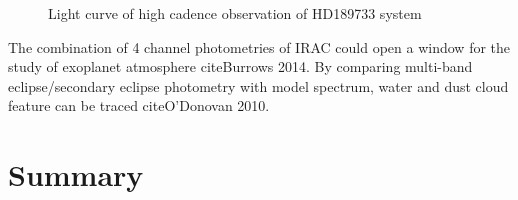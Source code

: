 \documentclass[preprint, 12pt]{aastex}
\begin{document}
\begin{figure}
  \centering
  \caption{Light curve of high cadence observation of HD189733 system}
  \label{fig:iraf-lc2}
\end{figure}

The combination of 4 channel photometries of IRAC could open a window
for the study of exoplanet atmosphere cite{Burrows 2014}. By comparing
multi-band eclipse/secondary eclipse photometry with model spectrum,
water and dust cloud feature can be traced cite{O'Donovan 2010}.


\section{Summary}
\end{document}
